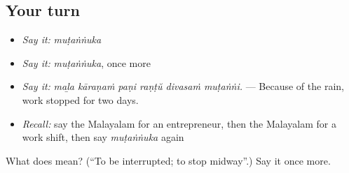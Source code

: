 \subsection*{Your turn}
\begin{itemize}
\raggedright
  \item \emph{Say it:} \emph{muṭaṅṅuka}
  \item \emph{Say it:} \emph{muṭaṅṅuka}, once more
  \item \emph{Say it:} \emph{maḻa kāraṇaṁ paṇi raṇṭŭ divasaṁ muṭaṅṅi.} — Because of the rain, work stopped for two days.
  \item \emph{Recall:} say the Malayalam for an entrepreneur, then the Malayalam for a work shift, then say \emph{muṭaṅṅuka} again
\end{itemize}

\begin{tcolorbox}[breakable,colback=teal!4,colframe=teal!35!black,title={Before you move on}]
What does  mean? (\textquotedblleft{}To be interrupted; to stop midway\textquotedblright{}.) Say it once more.
\end{tcolorbox}
